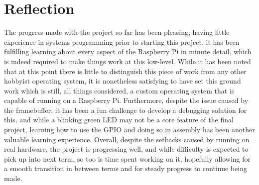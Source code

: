 \documentclass[10pt,a4paper]{article}
\begin{document}
\section*{Reflection}
The progress made with the project so far has been pleasing; having little
experience in systems programming prior to starting this project, it has been
fulfilling learning about every aspect of the Raspberry Pi in minute detail,
which is indeed required to make things work at this low-level. While it has been
noted that at this point there is little to distinguish this piece of work from
any other hobbyist operating system, it is nonetheless satisfying to have set
this ground work which is still, all things considered, a custom operating
system that is capable of running on a Raspberry Pi. Furthermore, despite the
issue caused by the framebuffer, it has been a fun challenge to develop a
debugging solution for this, and while a blinking green LED may not be a core
feature of the final project, learning how to use the GPIO and doing so in
assembly has been another valuable learning experience. Overall, despite the
setbacks caused by running on real hardware, the project is progressing well,
and while difficulty is expected to pick up into next term, so too is time spent
working on it, hopefully allowing for a smooth transition in between terms and
for steady progress to continue being made.



\begin{appendices}


    
    

    
    
    

\end{appendices}
\end{document}
